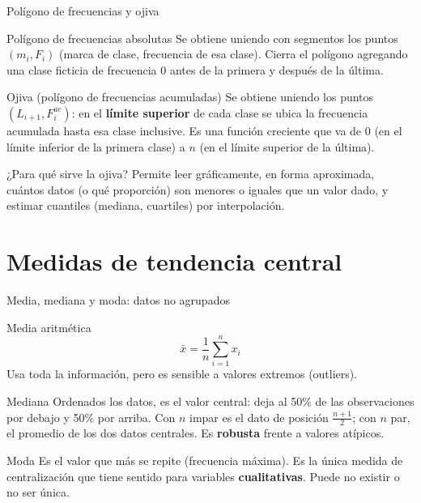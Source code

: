 \documentclass[aspectratio=169,11pt]{beamer}
\begin{document}
\begin{frame}{Polígono de frecuencias y ojiva}
\begin{block}{Polígono de frecuencias absolutas}
Se obtiene uniendo con segmentos los puntos $(m_i, F_i)$ (marca de clase, frecuencia de esa clase). Cierra el polígono agregando una clase ficticia de frecuencia 0 antes de la primera y después de la última.
\end{block}
\begin{block}{Ojiva (polígono de frecuencias acumuladas)}
Se obtiene uniendo los puntos $(L_{i+1}, F_i^{ac})$: en el \textbf{límite superior} de cada clase se ubica la frecuencia acumulada hasta esa clase inclusive. Es una función creciente que va de $0$ (en el límite inferior de la primera clase) a $n$ (en el límite superior de la última).
\end{block}
\begin{exampleblock}{¿Para qué sirve la ojiva?}
Permite leer gráficamente, en forma aproximada, cuántos datos (o qué proporción) son menores o iguales que un valor dado, y estimar cuantiles (mediana, cuartiles) por interpolación.
\end{exampleblock}
\end{frame}

\section{Medidas de tendencia central}

\begin{frame}{Media, mediana y moda: datos no agrupados}
\begin{block}{Media aritmética}
\[
\bar{x} = \frac{1}{n}\sum_{i=1}^{n} x_i
\]
Usa toda la información, pero es sensible a valores extremos (outliers).
\end{block}
\begin{block}{Mediana}
Ordenados los datos, es el valor central: deja al 50\% de las observaciones por debajo y 50\% por arriba. Con $n$ impar es el dato de posición $\frac{n+1}{2}$; con $n$ par, el promedio de los dos datos centrales. Es \textbf{robusta} frente a valores atípicos.
\end{block}
\begin{block}{Moda}
Es el valor que más se repite (frecuencia máxima). Es la única medida de centralización que tiene sentido para variables \textbf{cualitativas}. Puede no existir o no ser única.
\end{block}
\end{frame}
\end{document}
